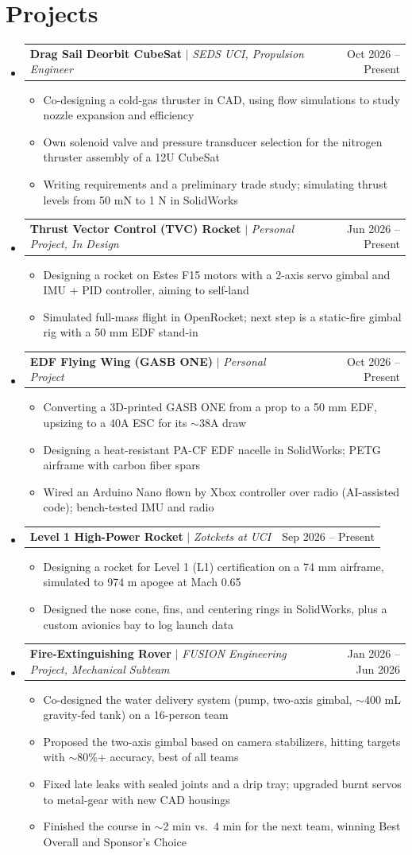 \documentclass[letterpaper,11pt]{article}
\makeatletter
\newcommand{\resumeItem}[1]{\item\small{{#1 \vspace{-2pt}}}}
\newcommand{\resumeProjectHeading}[2]{\item
  \begin{tabular*}{0.97\textwidth}{l@{\extracolsep{\fill}}r}
    \small#1 & #2 \\
  \end{tabular*}\vspace{-7pt}}
\newcommand{\resumeSubHeadingListStart}{\begin{itemize}[leftmargin=0.15in, label={}]}
\newcommand{\resumeSubHeadingListEnd}{\end{itemize}}
\newcommand{\resumeItemListStart}{\begin{itemize}}
\newcommand{\resumeItemListEnd}{\end{itemize}\vspace{-5pt}}
\makeatother
\begin{document}
\section{Projects}
\resumeSubHeadingListStart
  \resumeProjectHeading{\textbf{Drag Sail Deorbit CubeSat} $|$ \emph{SEDS UCI, Propulsion Engineer}}{Oct 2026 -- Present}
  \resumeItemListStart
    \resumeItem{Co-designing a cold-gas thruster in CAD, using flow simulations to study nozzle expansion and efficiency}
    \resumeItem{Own solenoid valve and pressure transducer selection for the nitrogen thruster assembly of a 12U CubeSat}
    \resumeItem{Writing requirements and a preliminary trade study; simulating thrust levels from 50 mN to 1 N in SolidWorks}
  \resumeItemListEnd
  \resumeProjectHeading{\textbf{Thrust Vector Control (TVC) Rocket} $|$ \emph{Personal Project, In Design}}{Jun 2026 -- Present}
  \resumeItemListStart
    \resumeItem{Designing a rocket on Estes F15 motors with a 2-axis servo gimbal and IMU + PID controller, aiming to self-land}
    \resumeItem{Simulated full-mass flight in OpenRocket; next step is a static-fire gimbal rig with a 50 mm EDF stand-in}
  \resumeItemListEnd
  \resumeProjectHeading{\textbf{EDF Flying Wing (GASB ONE)} $|$ \emph{Personal Project}}{Oct 2026 -- Present}
  \resumeItemListStart
    \resumeItem{Converting a 3D-printed GASB ONE from a prop to a 50 mm EDF, upsizing to a 40A ESC for its $\sim$38A draw}
    \resumeItem{Designing a heat-resistant PA-CF EDF nacelle in SolidWorks; PETG airframe with carbon fiber spars}
    \resumeItem{Wired an Arduino Nano flown by Xbox controller over radio (AI-assisted code); bench-tested IMU and radio}
  \resumeItemListEnd
  \resumeProjectHeading{\textbf{Level 1 High-Power Rocket} $|$ \emph{Zotckets at UCI}}{Sep 2026 -- Present}
  \resumeItemListStart
    \resumeItem{Designing a rocket for Level 1 (L1) certification on a 74 mm airframe, simulated to 974 m apogee at Mach 0.65}
    \resumeItem{Designed the nose cone, fins, and centering rings in SolidWorks, plus a custom avionics bay to log launch data}
  \resumeItemListEnd
  \resumeProjectHeading{\textbf{Fire-Extinguishing Rover} $|$ \emph{FUSION Engineering Project, Mechanical Subteam}}{Jan 2026 -- Jun 2026}
  \resumeItemListStart
    \resumeItem{Co-designed the water delivery system (pump, two-axis gimbal, $\sim$400 mL gravity-fed tank) on a 16-person team}
    \resumeItem{Proposed the two-axis gimbal based on camera stabilizers, hitting targets with $\sim$80\%+ accuracy, best of all teams}
    \resumeItem{Fixed late leaks with sealed joints and a drip tray; upgraded burnt servos to metal-gear with new CAD housings}
    \resumeItem{Finished the course in $\sim$2 min vs.\ 4 min for the next team, winning Best Overall and Sponsor's Choice}
  \resumeItemListEnd
\resumeSubHeadingListEnd
\end{document}
